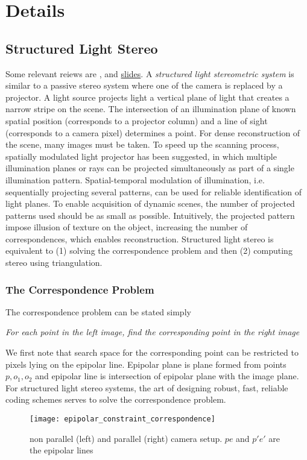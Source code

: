 \documentclass[../writeup.tex]{subfiles}
\begin{document}
  

\section{Details}
 
\subsection{Structured Light Stereo}

Some relevant reiews are \cite{salviPatternCodificationStrategies2004},\cite{salviStateArtStructured2010} and \href{http://www.sci.utah.edu/~gerig/CS6320-S2013/Materials/CS6320-CV-S2012-StructuredLight-II.pdf}{slides}. A \textit{structured light stereometric system} is similar to a passive stereo system where one of the camera is replaced by a projector. A light source projects light a vertical plane of light that creates a narrow stripe on the scene. The intersection of an illumination plane of known spatial position (corresponds to a projector column) and a line of sight (corresponds to a camera pixel) determines a point. For dense reconstruction of the scene, many images must be taken. To speed up the scanning process, spatially modulated light projector has been suggested, in which multiple illumination planes or rays can be projected simultaneously as part of a single illumination pattern. Spatial-temporal modulation of illumination, i.e. sequentially projecting several patterns, can be used for reliable identification of light planes. To enable acquisition of dynamic scenes, the number of projected patterns used should be as small as possible. Intuitively, the projected pattern impose illusion of texture on the object, increasing the number of correspondences, which enables reconstruction. Structured light stereo is equivalent to (1) solving the correspondence problem and then (2) computing stereo using triangulation.


\subsubsection{The Correspondence Problem}

The correspondence problem can be stated simply
\begin{center}
    \textit{
        For each point in the left image, find the corresponding point in the right image
    }
\end{center}
We first note that search space for the corresponding point can be restricted to pixels lying on the epipolar line. Epipolar plane is plane formed from points $p,o_1,o_2$ and epipolar line is intersection of epipolar plane with the image plane. For structured light stereo systems, the art of designing robust, fast, reliable coding schemes serves to solve the correspondence problem.
\begin{figure}[h!]
    \begin{center}
        \texttt{[image: epipolar\_constraint\_correspondence]}
        \caption{non parallel (left) and parallel (right) camera setup. $pe$ and $p'e'$ are the epipolar lines}
    \end{center}
\end{figure}
\end{document}
